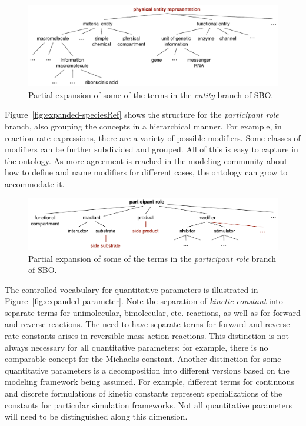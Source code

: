 \begin{figure}[htb]
  \centering
  \vspace*{-1ex}
  \includegraphics[scale = 0.8]{figs/sbo-entity}
  \caption{Partial expansion of some of the terms in the
    \emph{entity} branch of SBO.}
  \label{fig:expanded-species}
\end{figure}

Figure~\vref{fig:expanded-speciesRef} shows the structure
for the \emph{participant role} branch, also grouping the concepts in a hierarchical manner. For example, in reaction
rate expressions, there are a variety of possible modifiers.  Some
classes of modifiers can be further subdivided and grouped.  All
of this is easy to capture in the ontology.  As more agreement is
reached in the modeling community about how to define and name
modifiers for different cases, the ontology can grow to accommodate it.

\begin{figure}[htb]
  \centering
  \includegraphics[scale = 0.8]{figs/sbo-participant-role}
  \caption{Partial expansion of some of the terms in the
    \emph{participant role} branch of SBO.}
  \label{fig:expanded-speciesRef}
\end{figure}

The controlled vocabulary for quantitative
parameters is illustrated in
Figure~\vref{fig:expanded-parameter}.  Note the separation of
\emph{kinetic constant} into separate terms for unimolecular,
bimolecular, etc. reactions, as well as for forward and
reverse reactions.  The need to have separate terms for forward
and reverse rate constants arises in reversible mass-action
reactions.  This distinction is not always necessary for all
quantitative parameters; for example, there is no comparable
concept for the Michaelis constant.  Another distinction for some
quantitative parameters is a decomposition into different versions
based on the modeling framework being assumed.  For example,
different terms for continuous and discrete formulations of
kinetic constants represent specializations of the constants for
particular simulation frameworks.  Not all quantitative parameters
will need to be distinguished along this dimension.

